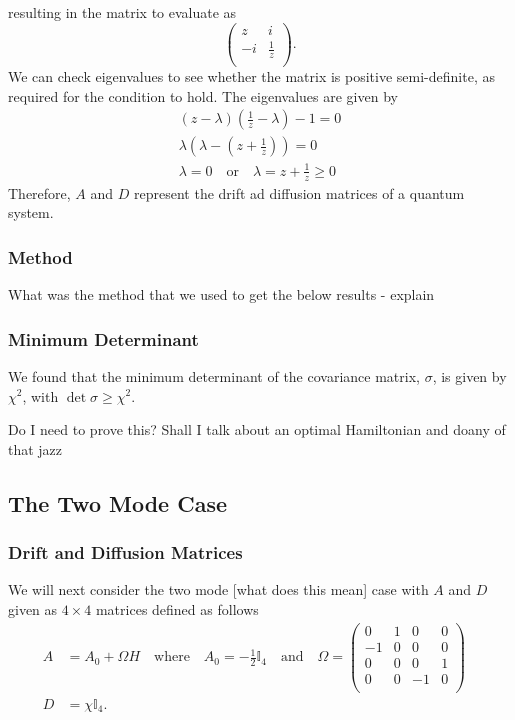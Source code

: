 \documentclass[11pt,a4paper]{article}
\numberwithin{equation}{section}
\begin{document}
	resulting in the matrix to evaluate as
	\begin{equation*}
	\begin{pmatrix}
	z & i  \\
	-i & \frac{1}{z} \\
	\end{pmatrix}.
	\end{equation*}
	We can check eigenvalues to see whether the matrix is positive semi-definite, as required for the condition to hold. The eigenvalues are given by
	\begin{align*}
	&(z- \lambda)(\frac{1}{z} - \lambda) - 1 = 0&\\
	&\lambda(\lambda - (z+ \frac{1}{z})) = 0&\\
	&\lambda = 0\quad\text{or}\quad\lambda= z+ \frac{1}{z} \geq 0&\tag*{as $z \geq 1$}
	\end{align*}
	Therefore, $A$ and $D$ represent the drift ad diffusion matrices of a quantum system. 
		
	\color{red}\subsubsection{Method}\color{black}
	What was the method that we used to get the below results - explain
	
	\subsubsection{Minimum Determinant}
	We found that the minimum determinant of the covariance matrix, $\sigma$, is given by $\chi^{2}$, with $\det \sigma \geq \chi^{2}$.
	
	\color{blue}Do I need to prove this? Shall I talk about an optimal Hamiltonian and doany of that jazz \color{black}
	
	\subsection{The Two Mode Case}
	\subsubsection{Drift and Diffusion Matrices}
	We will next consider the two mode \color{blue}[what does this mean] \color{black}case with $A$ and $D$ given as $4 \times 4$ matrices defined as follows
	\begin{align*}
	A &= A_0 + \Omega H \quad\text{where}\quad A_0 = -\frac{1}{2}\mathbb{I}_4\quad\text{and}\quad \Omega = \begin{pmatrix}
	0 & 1 & 0 & 0 \\
	-1 & 0 & 0 & 0\\
	0 & 0 & 0 & 1\\
	0 & 0 & -1 & 0\\
	\end{pmatrix} &\\
	D &= \chi \mathbb{I}_4 .&
	\end{align*}
	
\end{document}

